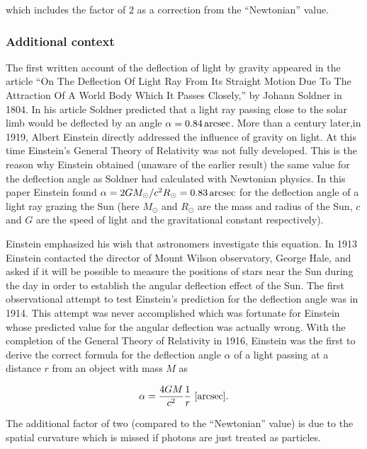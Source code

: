 \documentclass[a4paper,10pt]{article}
\begin{document}
{\noindent}which includes the factor of $2$ as a correction from the ``Newtonian'' value.

\subsubsection{Additional context}

The first written account of the deflection of light by gravity appeared in the article ``On The Deflection Of Light Ray From Its Straight Motion Due To The Attraction Of A World Body Which It Passes Closely,'' by Johann Soldner in 1804. In his article Soldner predicted that a light ray passing close to the solar limb would be deflected by an angle  $\alpha=0.84\,{\rm arcsec}$. More than a century later,in 1919, Albert Einstein directly addressed the influence of gravity on light. At this time Einstein's General Theory of Relativity was not fully developed. This is the reason why Einstein obtained (unaware of the earlier result) the same value for the deflection angle as Soldner had calculated with Newtonian physics. In this paper Einstein found $\alpha=2GM_\odot/c^2R_\odot=0.83\,{\rm arcsec}$ for the deflection angle of a light ray grazing the Sun (here $M_\odot$ and $R_\odot$ are the mass and radius of the Sun, $c$ and $G$ are the speed of light and the gravitational constant respectively). 

{\noindent}Einstein emphasized his wish that astronomers investigate this equation. In 1913 Einstein contacted the director of Mount Wilson observatory, George Hale, and asked if it will be possible to measure the positions of stars near the Sun during the day in order to establish the angular deflection effect of the Sun. The first observational attempt to test Einstein's prediction for the deflection angle was in 1914. This attempt was never accomplished which was fortunate for Einstein whose predicted value for the angular deflection was actually wrong. With the completion of the General Theory of Relativity in 1916, Einstein was the first to derive the correct formula for the deflection angle $\alpha$ of a light passing at a distance $r$ from an object with mass $M$ as

\begin{align*}
    \alpha = \frac{4GM}{c^2}\frac{1}{r} ~ [{\rm arcsec}].
\end{align*}

{\noindent}The additional factor of two (compared to the ``Newtonian'' value) is due to the spatial curvature which is missed if photons are just treated as particles.
\end{document}
